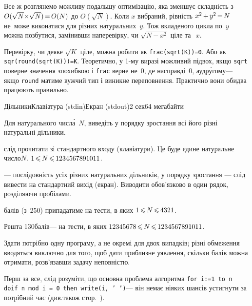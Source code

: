\documentclass[14pt,a4paper]{extarticle}
\def\dib#1{\,#1\discretionary{}{\mbox{$#1$}}{}\,}
\begin{document}
Все ж розглянемо можливу подальшу оптимізацію, яка зменшує складність з ${O(\sqrt{N}{\*}\sqrt{N})}\dib{{=}}{O(N)}$ до $O(\sqrt{N})$. Коли $x$ вибраний, рівність $x^2\dib{{+}}y^2\dib{{=}}N$ не~може виконатися для різних натуральних~$y$. Тож вкладеного цикла по~$y$ можна позбутися, замінивши на\nolinebreak[3] перевірку, чи $\sqrt{N{-}x^2}$ ціле та~${\>}x$.

\label{text:how-to-test-if-sqrt-N-integer}
Перевірку, чи деяке $\sqrt{K}$ ціле, можна робити як \verb"frac(sqrt(K))=0". Або як \verb"sqr(round(sqrt(K)))=K". Теоретично, у \mbox{1-му} виразі можливий підвох, якщо \texttt{sqrt} поверне значення з\nolinebreak[3] похибкою і \texttt{frac} верне не~0, де насправді~0, а\nolinebreak[3] у\nolinebreak[3] др\'{у}гому\nolinebreak[3] --- якщо \texttt{round} матиме вужчий тип і виникне переповнення. Практично вони обидва працюють правильно.


\begin{problem}{Дільники}{Клавіатура (stdin)}{Екран (stdout)}{2 сек}{64 мегабайти}

Для натурального числ\'{а}~$N$, виведіть у порядку зростання всі його різні натуральні дільники.

\InputFile	слід прочитати зі стандартного входу (клавіатури). Це буде єдине натуральне число\nolinebreak[3] $N$. $1\dib{{\<}}N\dib{{\<}}1234567891011$.

\OutputFile	--- послідовність усіх різних натуральних дільників, у порядку зростання — слід вивести на стандартний вихід (екран). Виводити обов’язково в один рядок, розділяючи пробілами.


\Examples
\begin{exampleSimple}{5em}{21em}%
%
%
\end{exampleSimple}

 балів (з~250) припадатиме на тести, в яких $1\dib{{\<}}N\dib{{\<}}4321$.

Решта 130\nolinebreak[3] балів\nolinebreak[3] --- на тести, в яких $12345678\dib{{\<}}N\dib{{\<}}1234567891011$.

Здати потрібно одну програму, а не окремі для двох випадків; різні обмеження вводяться виключно для того, щоб дати приблизне уявлення, скільки балів можна отримати, розв’язавши задачу не\nolinebreak[3] повністю.

\end{problem}
	

\Tutorial	Перш за все, слід розуміти, що основна проблема алгоритма \texttt{for \mbox{i:=1 to n} do\linebreak[2] if \mbox{n mod i = 0} then \mbox{write(i, ' ')}}\nolinebreak[3] --- він не\nolinebreak[3] має ніяких шансів устигнути за потрібний час (див.\nolinebreak[3] також стор.~\pageref{text:first-example-how-to-see-algo-will-not-fit-in-time-limit}).
\end{document}
